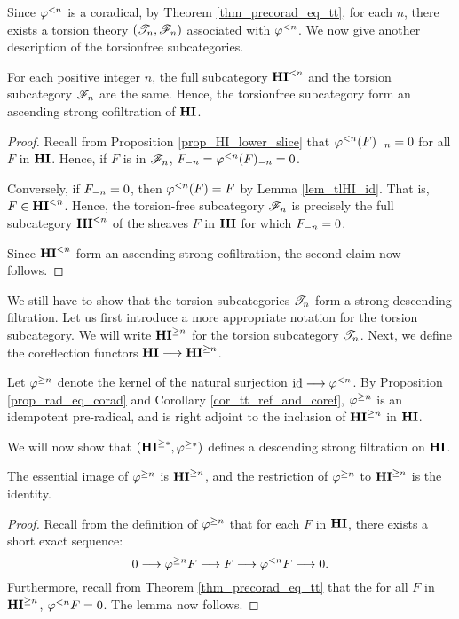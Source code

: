 Since $\tlHI{n}$ is a coradical, by Theorem 
\ref{thm_precorad_eq_tt}, for each $n$, there exists a torsion 
theory $(\Cat{T}_n, \Cat{F}_n)$ associated with $\tlHI{n}$. We
now give another description of the torsionfree subcategories.

\begin{prop}\label{prop_tsubcat_eq_tlHI}
For each positive integer $n$, the full subcategory $\TFHI{n}$ and the
torsion subcategory $\Cat{F}_n$ are the same. Hence, the torsionfree 
subcategory form an ascending strong cofiltration of $\HI$.
\end{prop}
\begin{proof}
Recall from Proposition \ref{prop_HI_lower_slice} that 
$\RHI[n]{\tlHI{n}(F)} = 0$ for all $F$ in $\HI$. Hence, if $F$ is 
in $\Cat{F}_n$, $\RHI[n]{F} = \RHI[n]{\tlHI{n}(F)} = 0$.

Conversely, if $\RHI[n]{F} = 0$, then $\tlHI{n}(F) = F$ by Lemma
\ref{lem_tlHI_id}. That is, $F \in \TFHI{n}$. Hence, the
torsion-free subcategory $\Cat{F}_n$ is precisely the full 
subcategory $\TFHI{n}$ of the sheaves $F$ in $\HI$ for which 
$\RHI[n]{F} = 0$.

Since $\TFHI{n}$ form an ascending strong cofiltration, the second
claim now follows.
\end{proof}

We still have to show that the torsion subcategories $\Cat{T}_n$
form a strong descending filtration. Let us first introduce a more
appropriate notation for the torsion subcategory. We will write
$\THI{n}$ for the torsion subcategory $\Cat{T}_n$. Next, we define 
the coreflection functors $\HI \to \THI{n}$. 

\begin{defn}\label{def_upper_slice_functor}
Let $\tgHI{n}$ denote the kernel of the natural surjection $\id 
\to \tlHI{n}$. By Proposition \ref{prop_rad_eq_corad} and 
Corollary \ref{cor_tt_ref_and_coref}, $\tgHI{n}$ is an idempotent 
pre-radical, and is right adjoint to the inclusion of $\THI{n}$ in
$\HI$.
\end{defn}

We will now show that $(\THI{*}, \tgHI{*})$ defines a descending 
strong filtration on $\HI$.

\begin{lem}\label{lem_tgHI_reflection}
The essential image of $\tgHI{n}$ is $\THI{n}$, and the 
restriction of $\tgHI{n}$ to $\THI{n}$ is the identity.
\end{lem}
\begin{proof}
Recall from the definition of $\tgHI{n}$ that for each $F$
in $\HI$, there exists a short exact sequence:
\[
0 \to \tgHI{n} F \to F \to \tlHI{n} F \to 0.
\]
Furthermore, recall from Theorem \ref{thm_precorad_eq_tt} that
the for all $F$ in $\THI{n}$, $\tlHI{n} F = 0$. The lemma now
follows.
\end{proof}

